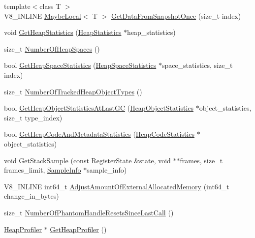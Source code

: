 \begin{DoxyCompactItemize}
{\footnotesize template$<$class T $>$ }\\V8\+\_\+\+I\+N\+L\+I\+NE \mbox{\hyperlink{classv8_1_1MaybeLocal}{Maybe\+Local}}$<$ T $>$ \mbox{\hyperlink{classv8_1_1Isolate_a0f5246dda7f87caf4635d862e31444cd}{Get\+Data\+From\+Snapshot\+Once}} (size\+\_\+t index)
\item 
void \mbox{\hyperlink{classv8_1_1Isolate_add32e78544edaf8946ed9b328167e5e4}{Get\+Heap\+Statistics}} (\mbox{\hyperlink{classv8_1_1HeapStatistics}{Heap\+Statistics}} $\ast$heap\+\_\+statistics)
\item 
size\+\_\+t \mbox{\hyperlink{classv8_1_1Isolate_ad948acf0892e677a95fbc743b63ca5fa}{Number\+Of\+Heap\+Spaces}} ()
\item 
bool \mbox{\hyperlink{classv8_1_1Isolate_a28ab96294ee07064cbba01e969b62cbc}{Get\+Heap\+Space\+Statistics}} (\mbox{\hyperlink{classv8_1_1HeapSpaceStatistics}{Heap\+Space\+Statistics}} $\ast$space\+\_\+statistics, size\+\_\+t index)
\item 
size\+\_\+t \mbox{\hyperlink{classv8_1_1Isolate_a170044cddf655345682cb3c9b4bd1788}{Number\+Of\+Tracked\+Heap\+Object\+Types}} ()
\item 
bool \mbox{\hyperlink{classv8_1_1Isolate_a677681d4c3abfc1bc2e8b50c23623e24}{Get\+Heap\+Object\+Statistics\+At\+Last\+GC}} (\mbox{\hyperlink{classv8_1_1HeapObjectStatistics}{Heap\+Object\+Statistics}} $\ast$object\+\_\+statistics, size\+\_\+t type\+\_\+index)
\item 
bool \mbox{\hyperlink{classv8_1_1Isolate_a11c60483e2e5ddec55003e1ca152d487}{Get\+Heap\+Code\+And\+Metadata\+Statistics}} (\mbox{\hyperlink{classv8_1_1HeapCodeStatistics}{Heap\+Code\+Statistics}} $\ast$object\+\_\+statistics)
\item 
void \mbox{\hyperlink{classv8_1_1Isolate_a8b173b48a477267ccd6c7d17c492b82e}{Get\+Stack\+Sample}} (const \mbox{\hyperlink{structv8_1_1RegisterState}{Register\+State}} \&state, void $\ast$$\ast$frames, size\+\_\+t frames\+\_\+limit, \mbox{\hyperlink{structv8_1_1SampleInfo}{Sample\+Info}} $\ast$sample\+\_\+info)
\item 
V8\+\_\+\+I\+N\+L\+I\+NE int64\+\_\+t \mbox{\hyperlink{classv8_1_1Isolate_aaeda5fa60961a3d9d476c46200e30711}{Adjust\+Amount\+Of\+External\+Allocated\+Memory}} (int64\+\_\+t change\+\_\+in\+\_\+bytes)
\item 
size\+\_\+t \mbox{\hyperlink{classv8_1_1Isolate_aa7df97ed0ea96925e60f519ffc09a33a}{Number\+Of\+Phantom\+Handle\+Resets\+Since\+Last\+Call}} ()
\item 
\mbox{\hyperlink{classv8_1_1HeapProfiler}{Heap\+Profiler}} $\ast$ \mbox{\hyperlink{classv8_1_1Isolate_a9c48259615e8370f6f0efd27cd7f99a6}{Get\+Heap\+Profiler}} ()
$$
\end{DoxyCompactItemize}
